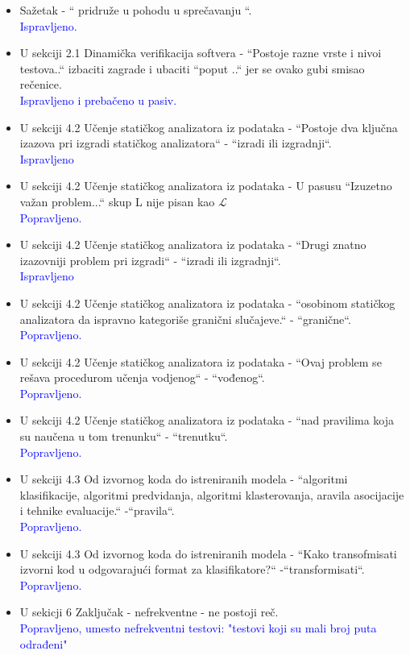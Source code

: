 \documentclass[a4paper]{report}
\newcommand{\odgovor}[1]{\textcolor{blue}{#1}}
\begin{document}
\begin{itemize}
   \item Sažetak - `` pridruže u pohodu u sprečavanju ``.
   \\\odgovor{Ispravljeno.}

   \item U sekciji 2.1 Dinamička verifikacija softvera - ``Postoje razne vrste i nivoi testova..`` izbaciti zagrade i ubaciti ``poput ..`` jer se ovako gubi smisao rečenice.
   \\\odgovor{Ispravljeno i prebačeno u pasiv.}

   \item U sekciji 4.2 Učenje statičkog analizatora iz podataka - ``Postoje dva ključna izazova pri izgradi statičkog analizatora`` - ``izradi ili izgradnji``.
   \\\odgovor{Ispravljeno}

   \item U sekciji 4.2 Učenje statičkog analizatora iz podataka - U pasusu ``Izuzetno važan problem...`` skup L nije pisan kao $\mathcal{L}$
   \\\odgovor{Popravljeno.}

   \item U sekciji 4.2 Učenje statičkog analizatora iz podataka - ``Drugi znatno izazovniji problem pri izgradi`` - ``izradi ili izgradnji``.
   \\\odgovor{Ispravljeno}

   \item U sekciji 4.2 Učenje statičkog analizatora iz podataka - ``osobinom statičkog analizatora da ispravno kategoriše granični slučajeve.`` - ``granične``.
   \\\odgovor{Popravljeno.}

   \item U sekciji 4.2 Učenje statičkog analizatora iz podataka - ``Ovaj problem se rešava procedurom učenja vodjenog`` - ``vođenog``.
   \\\odgovor{Popravljeno.}

   \item U sekciji 4.2 Učenje statičkog analizatora iz podataka - ``nad pravilima koja su naučena u tom trenunku`` - ``trenutku``.
   \\\odgovor{Popravljeno.}

   \item U sekciji 4.3 Od izvornog koda do istreniranih modela - ``algoritmi klasifikacije, algoritmi predvidanja, algoritmi klasterovanja, aravila asocijacije i tehnike evaluacije.`` -``pravila``.
   \\\odgovor{Popravljeno.}

   \item U sekciji 4.3 Od izvornog koda do istreniranih modela - ``Kako transofmisati izvorni kod u odgovarajući format za klasifikatore?`` -``transformisati``.
   \\\odgovor{Popravljeno.}

   \item U sekicji 6 Zaključak - nefrekventne - ne postoji reč.
   \\\odgovor{Popravljeno, umesto nefrekventni testovi: "testovi koji su mali broj puta odrađeni"\space}
\end{itemize}
\end{document}
